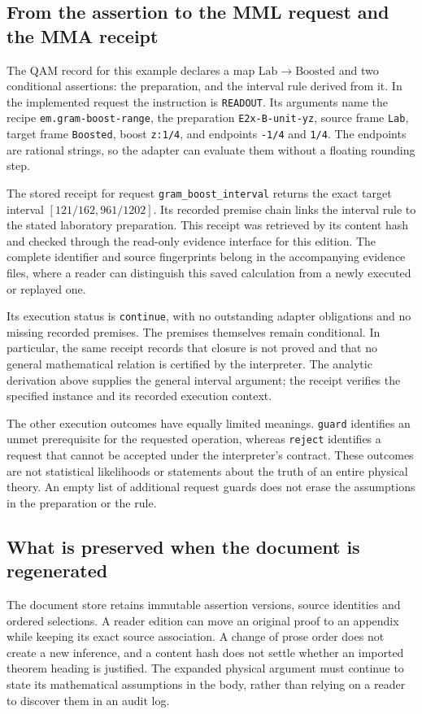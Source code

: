 \subsection{From the assertion to the MML request and the MMA receipt}
The QAM record for this example declares a map
$\mathrm{Lab}\to\mathrm{Boosted}$ and two conditional assertions:
the preparation, and the interval rule derived from it. In the
implemented request the instruction is \texttt{READOUT}. Its
arguments name the recipe \texttt{em.gram-boost-range}, the preparation
\texttt{E2x-B-unit-yz}, source frame \texttt{Lab}, target frame
\texttt{Boosted}, boost \texttt{z:1/4}, and endpoints
\texttt{-1/4} and \texttt{1/4}. The endpoints are rational strings,
so the adapter can evaluate them without a floating rounding step.

The stored receipt for request \texttt{gram\_boost\_interval} returns
the exact target interval $[121/162,961/1202]$. Its recorded premise
chain links the interval rule to the stated laboratory preparation.
This receipt was retrieved by its content hash and checked through
the read-only evidence interface for this edition. The complete
identifier and source fingerprints belong in the accompanying evidence
files, where a reader can distinguish this saved calculation from
a newly executed or replayed one.

Its execution status is \texttt{continue}, with no outstanding
adapter obligations and no missing recorded premises. The premises
themselves remain conditional. In particular, the same receipt records
that closure is not proved and that no general mathematical relation
is certified by the interpreter. The analytic derivation above supplies
the general interval argument; the receipt verifies the specified
instance and its recorded execution context.

The other execution outcomes have equally limited meanings.
\texttt{guard} identifies an unmet prerequisite for the requested
operation, whereas \texttt{reject} identifies a request that cannot
be accepted under the interpreter's contract. These outcomes are not
statistical likelihoods or statements about the truth of an entire
physical theory. An empty list of additional request guards does not
erase the assumptions in the preparation or the rule.

\subsection{What is preserved when the document is regenerated}
The document store retains immutable assertion versions, source
identities and ordered selections. A reader edition can move an
original proof to an appendix while keeping its exact source
association. A change of prose order does not create a new inference,
and a content hash does not settle whether an imported theorem heading
is justified. The expanded physical argument must continue to state
its mathematical assumptions in the body, rather than relying on a
reader to discover them in an audit log.

